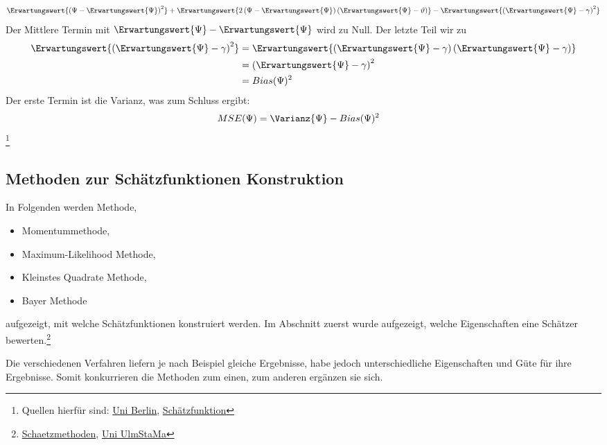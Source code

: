 \begin{align}
	\Erwartungswert{
		\left(\Psi - \Erwartungswert{\Psi}\right)^2
	}
	+
	\Erwartungswert{ 
		2\left(\Psi - \Erwartungswert{\Psi}\right)
		\left(\Erwartungswert{\Psi} - \vartheta \right) 
	}
	-
	\Erwartungswert{ 
		\left(\Erwartungswert{\Psi} - \gamma \right)^2
	}
\end{align}
Der Mittlere Termin mit $\Erwartungswert{\Psi} - \Erwartungswert{\Psi}$ wird zu Null. Der letzte Teil wir zu
\begin{align}
	\Erwartungswert{\left(\Erwartungswert{\Psi} - \gamma \right)^2} &=
	\Erwartungswert{
		\left(\Erwartungswert{\Psi} - \gamma \right)
		\left(\Erwartungswert{\Psi} - \gamma \right)
	}\\
	&= \left(\Erwartungswert{\Psi} - \gamma \right)^2\\
	&= Bias(\Psi)^2
\end{align}
Der erste Termin ist die Varianz, was zum Schluss ergibt:
\begin{align}
	MSE(\Psi) & = 	\Varianz{\Psi} - Bias(\Psi)^2
\end{align}
\footnote{Quellen hierfür sind: \href{https://wikis.hu-berlin.de/mmstat/MittlerequadratischeAbweichung(stochastisch)}{Uni Berlin}, \href{https://de.wikipedia.org/wiki/SchätzfunktionKonsistenz}{Schätzfunktion}}

\subsection{Methoden zur Schätzfunktionen Konstruktion}

In Folgenden werden Methode,
\begin{itemize}
	\item Momentummethode,
	\item Maximum-Likelihood Methode,
	\item Kleinstes Quadrate Methode,
	\item Bayer Methode
\end{itemize}
aufgezeigt, mit welche Schätzfunktionen konstruiert werden. Im Abschnitt zuerst wurde aufgezeigt, welche Eigenschaften eine Schätzer bewerten.\footnote{
\href{https://de.wikipedia.org/wiki/Schätzmethode(Statistik)}{Schaetzmethoden},
\href{https://www.uni-ulm.de/fileadmin/websiteuniulm/mawi.inst.110/lehre/ss13/Stochastik_I/Skript5.pdf}{Uni UlmStaMa}}

Die verschiedenen Verfahren liefern je nach Beispiel gleiche Ergebnisse, habe jedoch unterschiedliche Eigenschaften und Güte für ihre Ergebnisse. Somit konkurrieren die Methoden zum einen, zum anderen ergänzen sie sich.

